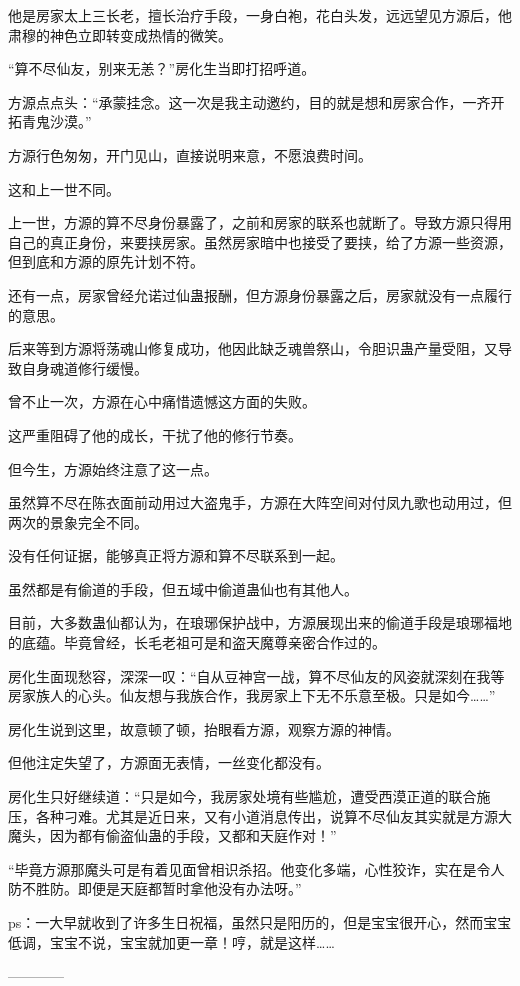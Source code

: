 \begin{this_body}
他是房家太上三长老，擅长治疗手段，一身白袍，花白头发，远远望见方源后，他肃穆的神色立即转变成热情的微笑。

“算不尽仙友，别来无恙？”房化生当即打招呼道。

方源点点头：“承蒙挂念。这一次是我主动邀约，目的就是想和房家合作，一齐开拓青鬼沙漠。”

方源行色匆匆，开门见山，直接说明来意，不愿浪费时间。

这和上一世不同。

上一世，方源的算不尽身份暴露了，之前和房家的联系也就断了。导致方源只得用自己的真正身份，来要挟房家。虽然房家暗中也接受了要挟，给了方源一些资源，但到底和方源的原先计划不符。

还有一点，房家曾经允诺过仙蛊报酬，但方源身份暴露之后，房家就没有一点履行的意思。

后来等到方源将荡魂山修复成功，他因此缺乏魂兽祭山，令胆识蛊产量受阻，又导致自身魂道修行缓慢。

曾不止一次，方源在心中痛惜遗憾这方面的失败。

这严重阻碍了他的成长，干扰了他的修行节奏。

但今生，方源始终注意了这一点。

虽然算不尽在陈衣面前动用过大盗鬼手，方源在大阵空间对付凤九歌也动用过，但两次的景象完全不同。

没有任何证据，能够真正将方源和算不尽联系到一起。

虽然都是有偷道的手段，但五域中偷道蛊仙也有其他人。

目前，大多数蛊仙都认为，在琅琊保护战中，方源展现出来的偷道手段是琅琊福地的底蕴。毕竟曾经，长毛老祖可是和盗天魔尊亲密合作过的。

房化生面现愁容，深深一叹：“自从豆神宫一战，算不尽仙友的风姿就深刻在我等房家族人的心头。仙友想与我族合作，我房家上下无不乐意至极。只是如今……”

房化生说到这里，故意顿了顿，抬眼看方源，观察方源的神情。

但他注定失望了，方源面无表情，一丝变化都没有。

房化生只好继续道：“只是如今，我房家处境有些尴尬，遭受西漠正道的联合施压，各种刁难。尤其是近日来，又有小道消息传出，说算不尽仙友其实就是方源大魔头，因为都有偷盗仙蛊的手段，又都和天庭作对！”

“毕竟方源那魔头可是有着见面曾相识杀招。他变化多端，心性狡诈，实在是令人防不胜防。即便是天庭都暂时拿他没有办法呀。”

ps：一大早就收到了许多生日祝福，虽然只是阳历的，但是宝宝很开心，然而宝宝低调，宝宝不说，宝宝就加更一章！哼，就是这样……

------------

\end{this_body}

